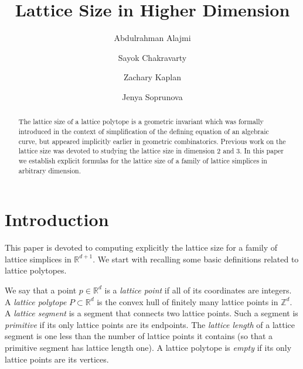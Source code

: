\documentclass[11pt]{amsart}
\title{Lattice Size in Higher Dimension}
\author{Abdulrahman Alajmi}
\author{Sayok Chakravarty}
\author{Zachary Kaplan}
\author{Jenya Soprunova}
\numberwithin{equation}{section}
\theoremstyle{plain}
\theoremstyle{definition}
\newcommand{\Z}{\mathbb Z}
\newcommand{\R}{\mathbb R}
\newcommand{\ls}{\operatorname{ls_\Delta}}
\begin{document}
\begin{abstract} The lattice size of a lattice polytope is a geometric invariant which was formally introduced in the context of simplification of the defining equation  of an algebraic curve, but  appeared implicitly earlier
in geometric combinatorics. Previous work on the lattice size was devoted to studying the lattice size in dimension 2 and 3.
In this paper we establish explicit formulas for the lattice size of a family of lattice simplices in arbitrary dimension. 
\end{abstract}






\maketitle



\section{Introduction} 
This paper is devoted to computing explicitly the lattice size for a family of lattice simplices in $\R^{d+1}$.
We start with recalling some basic definitions related to lattice polytopes.

We say that a point $p\in\R^d$ is a {\it lattice point} if all of its coordinates are integers. A {\it lattice polytope}
$P\subset\R^d$ is the convex hull of finitely many lattice points in $\Z^d$. A {\it lattice segment} is a segment that connects two
lattice points. Such a segment is {\it primitive} if its only lattice points are its endpoints. The {\it lattice length} of a lattice segment
is one less than the number of lattice points it contains (so that a primitive segment has lattice length one). A lattice polytope is {\it empty} if its only lattice points are its vertices.
\end{document}
